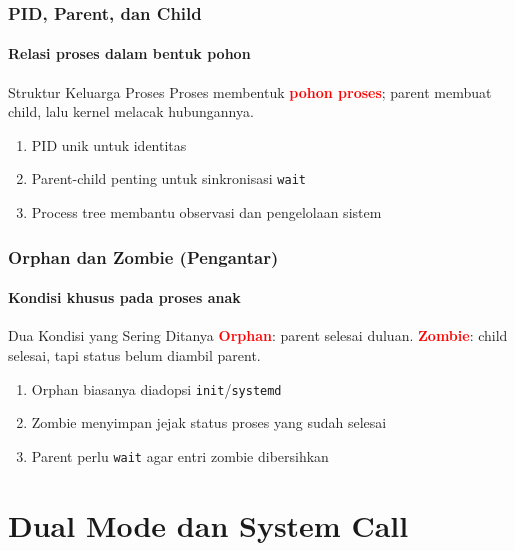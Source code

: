 \documentclass[t,aspectratio=169,xcolor=dvipsnames]{beamer}
\newcommand{\tem}[1]{\textbf{\textcolor{red}{#1}}}
\begin{document}
\begin{frame}
    \frametitle{PID, Parent, dan Child}
    \framesubtitle{Relasi proses dalam bentuk pohon}
    \begin{block}{Struktur Keluarga Proses}
        Proses membentuk \tem{pohon proses}; parent membuat child, lalu kernel melacak hubungannya.
    \end{block}
    \vspace{0.1cm}
    \small
    \begin{enumerate}
        \item PID unik untuk identitas
        \item Parent-child penting untuk sinkronisasi \texttt{wait}
        \item Process tree membantu observasi dan pengelolaan sistem
    \end{enumerate}
\end{frame}

\begin{frame}
    \frametitle{Orphan dan Zombie (Pengantar)}
    \framesubtitle{Kondisi khusus pada proses anak}
    \begin{exampleblock}{Dua Kondisi yang Sering Ditanya}
        \tem{Orphan}: parent selesai duluan. \tem{Zombie}: child selesai, tapi status belum diambil parent.
    \end{exampleblock}
    \vspace{0.1cm}
    \small
    \begin{enumerate}
        \item Orphan biasanya diadopsi \texttt{init}/\texttt{systemd}
        \item Zombie menyimpan jejak status proses yang sudah selesai
        \item Parent perlu \texttt{wait} agar entri zombie dibersihkan
    \end{enumerate}
\end{frame}

\section{Dual Mode dan System Call}
\end{document}
